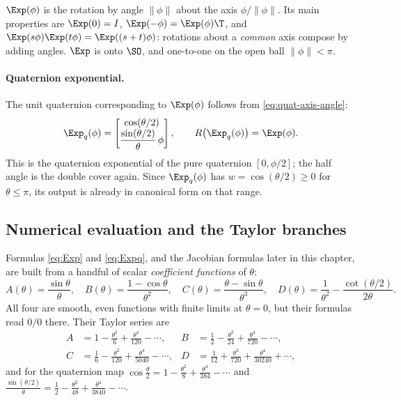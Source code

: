$\Exp(\phi)$ is the rotation by angle $\|\phi\|$ about the axis $\phi/\|\phi\|$. Its main properties are
$\Exp(0) = I$, $\Exp(-\phi) = \Exp(\phi)\T$, and $\Exp(s\phi)\Exp(t\phi) = \Exp((s+t)\phi)$: rotations about a
\emph{common} axis compose by adding angles. $\Exp$ is onto $\SO$, and one-to-one on the open ball
$\|\phi\| < \pi$.

\paragraph{Quaternion exponential.} The unit quaternion corresponding to $\Exp(\phi)$ follows from
\eqref{eq:quat-axis-angle}:
\begin{equation}
  \Exp_q(\phi) = \begin{bmatrix} \cos(\theta/2) \\ \dfrac{\sin(\theta/2)}{\theta}\,\phi \end{bmatrix},
  \qquad R\big(\Exp_q(\phi)\big) = \Exp(\phi).
  \label{eq:Expq}
\end{equation}
This is the quaternion exponential of the pure quaternion $[0, \phi/2]$; the half angle is the double
cover again. Since $\Exp_q(\phi)$ has $w = \cos(\theta/2) \ge 0$ for $\theta \le \pi$, its output is
already in canonical form on that range.

\subsection{Numerical evaluation and the Taylor branches}
\label{sec:taylor}

Formulas \eqref{eq:Exp} and \eqref{eq:Expq}, and the Jacobian formulas later in this chapter, are built
from a handful of scalar \emph{coefficient functions} of $\theta$:
\begin{equation}
  A(\theta) = \frac{\sin\theta}{\theta},\quad
  B(\theta) = \frac{1-\cos\theta}{\theta^2},\quad
  C(\theta) = \frac{\theta - \sin\theta}{\theta^3},\quad
  D(\theta) = \frac{1}{\theta^2} - \frac{\cot(\theta/2)}{2\theta}.
\end{equation}
All four are smooth, even functions with finite limits at $\theta = 0$, but their formulas read $0/0$
there. Their Taylor series are
\begin{equation}
\begin{aligned}
  A &= 1 - \tfrac{\theta^2}{6} + \tfrac{\theta^4}{120} - \cdots, &
  B &= \tfrac12 - \tfrac{\theta^2}{24} + \tfrac{\theta^4}{720} - \cdots, \\
  C &= \tfrac16 - \tfrac{\theta^2}{120} + \tfrac{\theta^4}{5040} - \cdots, &
  D &= \tfrac1{12} + \tfrac{\theta^2}{720} + \tfrac{\theta^4}{30240} + \cdots,
\end{aligned}
\label{eq:coeff-taylor}
\end{equation}
and for the quaternion map
$\cos\frac\theta2 = 1 - \frac{\theta^2}{8} + \frac{\theta^4}{384} - \cdots$ and
$\frac{\sin(\theta/2)}{\theta} = \frac12 - \frac{\theta^2}{48} + \frac{\theta^4}{3840} - \cdots$.


